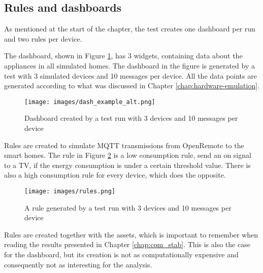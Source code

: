 \subsection{Rules and dashboards}
As mentioned at the start of the chapter, the test creates one dashboard per run and two rules per device.

The dashboard, shown in Figure \ref{fig:dash_example_alt}, has 3 widgets, containing data about the appliances in all simulated homes. The dashboard in the figure is generated by a test with 3 simulated devices and 10 messages per device. All the data points are generated according to what was discussed in Chapter \ref{chap:hardware-emulation}.

\begin{figure}[ht]
	\centering
	\texttt{[image: images/dash\_example\_alt.png]}
	\caption{Dashboard created by a test run with 3 devices and 10 messages per device}
	\label{fig:dash_example_alt}
\end{figure}

Rules are created to simulate MQTT transmissions from OpenRemote to the smart homes. The rule in Figure \ref{fig:rules_example} is a low consumption rule, send an on signal to a TV, if the energy consumption is under a certain threshold value. There is also a high consumption rule for every device, which does the opposite.

\begin{figure}[ht]
	\centering
	\texttt{[image: images/rules.png]}
	\caption{A rule generated by a test run with 3 devices and 10 messages per device}
	\label{fig:rules_example}
\end{figure}

Rules are created together with the assets, which is important to remember when reading the results presented in Chapter \ref{chap:com_stab}. This is also the case for the dashboard, but its creation is not as computationally expensive and consequently not as interesting for the analysis.
